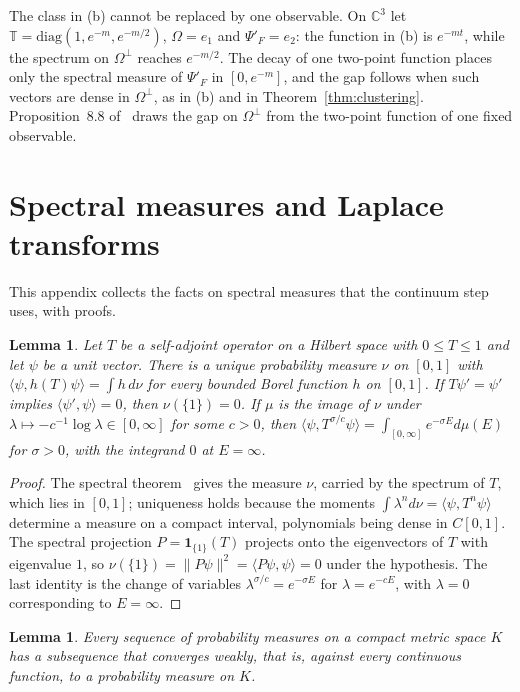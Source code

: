 \documentclass[11pt]{amsart}
\newtheorem{lemma}[theorem]{Lemma}
\theoremstyle{definition}
\theoremstyle{remark}
\numberwithin{equation}{section}
\newcommand{\C}{\mathbb{C}}
\newcommand{\ip}[2]{\langle #1,#2\rangle}
\begin{document}
The class in (b) cannot be replaced by one observable. On $\C^3$ let
$\mathbb T=\mathrm{diag}(1,e^{-m},e^{-m/2})$, $\Omega=e_1$ and $\Psi'_F=e_2$:
the function in (b) is $e^{-mt}$, while the spectrum on $\Omega^\perp$ reaches
$e^{-m/2}$. The decay of one two-point function places only the spectral
measure of $\Psi'_F$ in $[0,e^{-m}]$, and the gap follows when such vectors
are dense in $\Omega^\perp$, as in (b) and in Theorem~\ref{thm:clustering}.
Proposition~8.8 of~\cite{FaS26} draws the gap on $\Omega^\perp$ from the
two-point function of one fixed observable.

\section{Spectral measures and Laplace transforms}\label{app:spectral}

This appendix collects the facts on spectral measures that the continuum
step uses, with proofs.

\begin{lemma}\label{lem:spectralmeasure}
Let $T$ be a self-adjoint operator on a Hilbert space with $0\le T\le1$ and
let $\psi$ be a unit vector. There is a unique probability measure $\nu$ on
$[0,1]$ with $\ip\psi{h(T)\psi}=\int h\,d\nu$ for every bounded Borel
function $h$ on $[0,1]$. If $T\psi'=\psi'$ implies $\ip{\psi'}\psi=0$, then
$\nu(\{1\})=0$. If $\mu$ is the image of $\nu$ under
$\lambda\mapsto-c^{-1}\log\lambda\in[0,\infty]$ for some $c>0$, then
$\ip\psi{T^{\sigma/c}\psi}=\int_{[0,\infty]}e^{-\sigma E}d\mu(E)$ for
$\sigma>0$, with the integrand $0$ at $E=\infty$.
\end{lemma}

\begin{proof}
The spectral theorem~\cite[Sec.~VII.2]{RS80} gives the measure $\nu$,
carried by the spectrum of $T$, which lies in $[0,1]$; uniqueness
holds because the moments $\int\lambda^n d\nu=\ip\psi{T^n\psi}$ determine a
measure on a compact interval, polynomials being dense in $C[0,1]$. The
spectral projection $P=\mathbf 1_{\{1\}}(T)$ projects onto the eigenvectors
of $T$ with eigenvalue $1$, so $\nu(\{1\})=\|P\psi\|^2=\ip{P\psi}\psi=0$
under the hypothesis. The last identity is the change of variables
$\lambda^{\sigma/c}=e^{-\sigma E}$ for $\lambda=e^{-cE}$, with $\lambda=0$
corresponding to $E=\infty$.
\end{proof}

\begin{lemma}\label{lem:helly}
Every sequence of probability measures on a compact metric space $K$ has a
subsequence that converges weakly, that is, against every continuous
function, to a probability measure on $K$.
\end{lemma}
\end{document}
